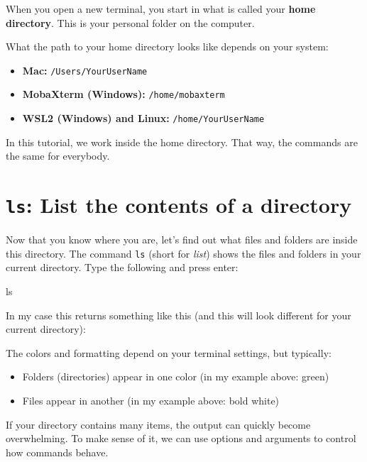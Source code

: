 \documentclass[
  letterpaper,
  DIV=11,
  numbers=noendperiod]{scrreprt}
\newenvironment{Shaded}{}{}
\newcommand{\FunctionTok}[1]{\textcolor[rgb]{0.44,0.26,0.76}{#1}}
\providecommand{\tightlist}{%
  \setlength{\itemsep}{0pt}\setlength{\parskip}{0pt}}
\begin{document}
When you open a new terminal, you start in what is called your
\textbf{home directory}. This is your personal folder on the computer.

What the path to your home directory looks like depends on your system:

\begin{itemize}
\tightlist
\item
  \textbf{Mac:} \texttt{/Users/YourUserName}
\item
  \textbf{MobaXterm (Windows):} \texttt{/home/mobaxterm}
\item
  \textbf{WSL2 (Windows) and Linux:} \texttt{/home/YourUserName}
\end{itemize}

In this tutorial, we work inside the home directory. That way, the
commands are the same for everybody.

\section{\texorpdfstring{\texttt{ls}: List the contents of a
directory}{ls: List the contents of a directory}}\label{ls-list-the-contents-of-a-directory}

Now that you know where you are, let's find out what files and folders
are inside this directory. The command \texttt{ls} (short for
\emph{list}) shows the files and folders in your current directory. Type
the following and press enter:

\begin{Shaded}
\begin{Highlighting}[]
\FunctionTok{ls}
\end{Highlighting}
\end{Shaded}

In my case this returns something like this (and this will look
different for your current directory):

The colors and formatting depend on your terminal settings, but
typically:

\begin{itemize}
\tightlist
\item
  Folders (directories) appear in one color (in my example above: green)
\item
  Files appear in another (in my example above: bold white)
\end{itemize}

If your directory contains many items, the output can quickly become
overwhelming. To make sense of it, we can use options and arguments to
control how commands behave.
\end{document}
